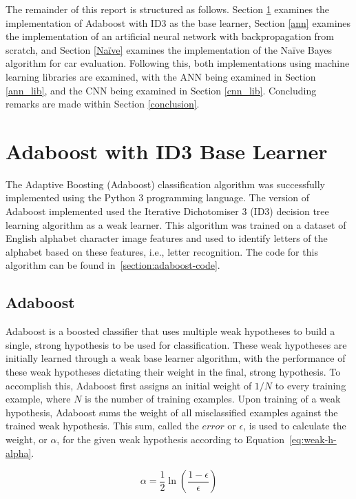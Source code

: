 \documentclass[a4paper]{article}
\begin{document}
The remainder of this report is structured as follows. Section \ref{adaboost} examines the implementation of Adaboost with ID3 as the base learner, Section \ref{ann} examines the implementation of an artificial neural network with backpropagation from scratch, and Section \ref{Naïve} examines the implementation of the Naïve Bayes algorithm for car evaluation. Following this, both implementations using machine learning libraries are examined, with the ANN being examined in Section \ref{ann_lib}, and the CNN being examined in Section \ref{cnn_lib}. Concluding remarks are made within Section \ref{conclusion}.

\section{Adaboost with ID3 Base Learner}\label{adaboost}
The Adaptive Boosting (Adaboost) classification algorithm was successfully implemented using the Python 3 programming language. The version of Adaboost implemented used the Iterative Dichotomiser 3 (ID3) decision tree learning algorithm as a weak learner. This algorithm was trained on a dataset of English alphabet character image features and used to identify letters of the alphabet based on these features, i.e., letter recognition. The code for this algorithm can be found in~\ref{section:adaboost-code}.

\subsection{Adaboost}
Adaboost is a boosted classifier that uses multiple weak hypotheses to build a single, strong hypothesis to be used for classification. These weak hypotheses are initially learned through a weak base learner algorithm, with the performance of these weak hypotheses dictating their weight in the final, strong hypothesis. To accomplish this, Adaboost first assigns an initial weight of $1/N$ to every training example, where $N$ is the number of training examples. Upon training of a weak hypothesis, Adaboost sums the weight of all misclassified examples against the trained weak hypothesis.  This sum, called the $error$ or $\epsilon$, is used to calculate the weight, or $\alpha$, for the given weak hypothesis according to Equation~\ref{eq:weak-h-alpha}.

\begin{equation}
    \label{eq:weak-h-alpha}
    \alpha = \frac{1}{2}\ln\left(\frac{1-\epsilon}{\epsilon}\right)
\end{equation}
\end{document}

